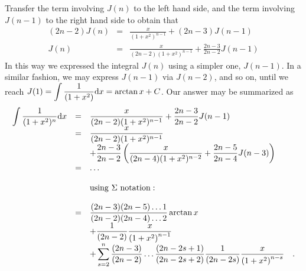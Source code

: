 \documentclass[12pt]{book}
\begin{document}
\noindent Transfer the term involving $J(n)$ to the left hand side, and the term involving $J(n-1)$ to the right hand side to obtain that
\[
\begin{array}{rcl}
\displaystyle (2n-2)J(n)&=&\displaystyle \frac{x}{(1+x ^2)^{n-1}}+ (2n-3)J(n-1)\\
\displaystyle J(n)&=&\displaystyle \frac{x}{(2n-2)(1+x ^2)^{n-1}}+ \frac{2n-3}{2n-2}J(n-1)
\end{array}
\]
In this way we expressed the integral $J(n)$ using a simpler one, $J(n-1)$. In a similar fashion, we may express $J(n-1)$ via $J(n-2)$, and so on, until we reach $\displaystyle J(1)= \int \frac{1}{(1+x^2)}{\normalfont \text{d}} x=\arctan x +C$. Our answer may be summarized as
\[
\begin{array}{rcl}
\displaystyle \int \frac{1}{(1+x^2)^n}{\normalfont \text{d}} x&=& \displaystyle  \frac{x}{(2n-2)(1+x ^2)^{ n-1}}+\frac{2n-3}{2n-2} J(n-1)\\
&=&\displaystyle \frac{x}{(2n-2)(1+x ^2)^{n-1}}\\
&&\displaystyle +\frac{2n-3}{2n-2} \left(\frac{x}{(2n -4)(1 +x^2 )^{n -2}} +\frac{ 2n-5 }{2n-4} J(n-3) \right)\\
&=&\dots\\ \\
&&\mathrm{using~}\Sigma \mathrm{~notation:}\\ \\
&=&\displaystyle \frac{(2n-3 )(2n-5)\dots 1}{(2n-2)(2n-4)\dots 2}\arctan x\\
&&\displaystyle + 
\frac{1}{(2n-2)}\frac{x}{ \left(1+x^2\right)^{n-1}}\\
&&\displaystyle + 
\sum_{s=2}^{n} \frac{(2n-3) }{(2n-2)}\dots \frac{(2n-2s+1)}{(2n-2s+2)} \frac{1}{(2n-2s)}\frac{x}{ \left(1+x^2\right)^{n-s}}
\quad .
\end{array}
\]
\end{document}
